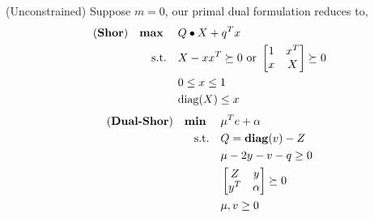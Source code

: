 \documentclass[../main]{subfiles}
\begin{document}
\begin{remark}
    (Unconstrained) Suppose \(m = 0\), our primal dual formulation reduces to,
    \begin{equation}
        \begin{aligned}
            (\textbf{Shor}) \quad\mathbf{max}\;\quad & Q\bullet X   + q^T x                                             \\
            \mathrm{s.t.}  \quad       & X-xx^T \succeq 0 \text { or }\begin{bmatrix} 1 & x^{T} \\ x & X \end{bmatrix} \succeq 0 \\
                                       & 0\le x\le 1                                                      \\
                                       & \mathrm{diag}(X) \le x
        \end{aligned}
    \end{equation}
    \begin{equation}
        \begin{aligned}
            (\textbf{Dual-Shor}) \quad \mathbf{min}\;\quad & \mu^Te + \alpha                     \\
            \mathrm{s.t.} \quad              & Q = \mathbf{diag}(v)  -Z                    \\
                                             & \mu - 2 y - v - q \ge 0             \\
                                             & \begin{bmatrix}Z & y \\ y^T & \alpha\end{bmatrix} \succeq 0 \\
                                             & \mu, v \ge 0
        \end{aligned}
    \end{equation}
\end{remark}



\end{document}
